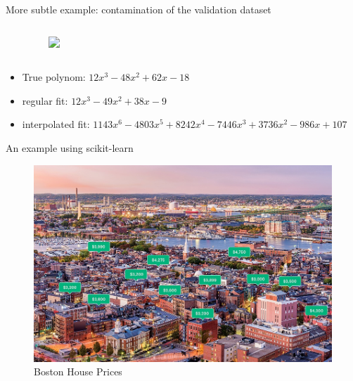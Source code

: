 \documentclass[handout]{beamer}
\begin{document}
\begin{frame}{More subtle example: contamination of the validation dataset}
\begin{columns}
\begin{center}
\begin{tikzpicture}
  \end{tikzpicture}
\end{center}
\begin{figure}
    \centering
    \includegraphics<3->[width=\textwidth]{fig/L1/leakage-cv.png}

\end{figure}
\end{columns}

\begin{itemize}
    \item<1-> True polynom: $12x^3 - 48x^2 + 62x - 18$
    \item<5-> regular fit: $12x^3 - 49x^2 + 38x - 9$
    \item<5-> interpolated fit: $1143x^6 - 4803x^5 + 8242x^4 - 7446x^3 + 3736x^2 - 986x + 107 $
    
\end{itemize}

        
\end{frame}


\begin{frame}{An example using scikit-learn}
    \begin{figure}
    \caption*{Boston House Prices}
    \includegraphics[width=.9\textwidth]{fig/L1/boston-rent.jpg}
    \end{figure}
\end{frame}
\end{document}
